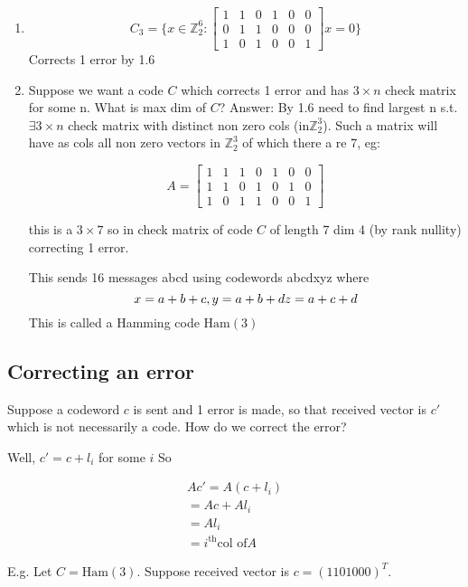 \documentclass[amsfonts]{amsart}
\theoremstyle{definition}
\theoremstyle{remark}
\numberwithin{equation}{section}
\begin{document}
\begin{enumerate}
\item 
\[C_3 = \{
	x \in \mathbb{Z}_2^6 : \begin{bmatrix}
	1 & 1 & 0 & 1 & 0 & 0 \\
	0 & 1 & 1 & 0 & 0 & 0 \\
	1 & 0 & 1 & 0 & 0 & 1
	\end{bmatrix}x = 0
\}\]
Corrects 1 error by 1.6

\item Suppose we want a code \(C\) which corrects 1 error and has \(3 \times n\) check matrix for some n. What is max dim of \(C\)?
Answer:
By 1.6 need to find largest n s.t. \(\exists 3 \times n \) check matrix with distinct non zero cols (in\(\mathbb{Z}_2^3\)). Such a matrix will have as cols all non zero vectors in \(\mathbb{Z}_2^3\) of which there a re 7, eg:

\[
A = \begin{bmatrix}
	1 & 1 & 1 & 0 & 1 & 0 & 0 \\
	1 & 1 & 0 & 1 & 0 & 1 & 0 \\
	1 & 0 & 1 & 1 & 0 & 0 & 1
	\end{bmatrix}
\]

this is a \(3\times 7\) so in check matrix of code \(C\) of length 7 dim 4 (by rank nullity) correcting 1 error.

This sends 16 messages abcd using codewords abcdxyz where 
\[
	x = a + b + c,\\
	y = a +b + d \\
	z = a + c + d
\]
This is called a Hamming code \(\text{Ham}(3)\)

\end{enumerate}
\subsection{Correcting an error}
Suppose a codeword \(c\) is sent and 1 error is made, so that received vector is \(c'\) which is not necessarily a code. How do we correct the error?

Well, $c' = c + l_i$ for some $i$
So

\begin{align}
	Ac' = A(c+l_i) \\
		= Ac + Al_i \\
		= Al_i \\
		= i^\text{th} \text{col of} A
\end{align}

E.g. Let $C = \text{Ham}(3)$.
Suppose received vector is $c= (1101000)^T$.
\end{document}
